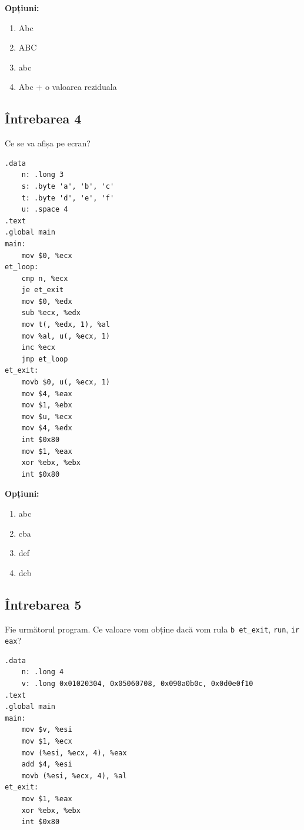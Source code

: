 \documentclass[12pt,a4paper]{article}
\begin{document}
\textbf{Opțiuni:}
\begin{multicols}{2}
\begin{enumerate}[label=\alph*)]
    \item Abc
    \item ABC 
    \item abc
    \item Abc + o valoarea reziduala
\end{enumerate}
\end{multicols}

\subsection*{Întrebarea 4}
Ce se va afișa pe ecran?
\begin{multicols}{2}
\begin{lstlisting}[language=x86asm]
.data
    n: .long 3
    s: .byte 'a', 'b', 'c'
    t: .byte 'd', 'e', 'f'
    u: .space 4
.text
.global main
main:
    mov $0, %ecx
et_loop:
    cmp n, %ecx
    je et_exit
    mov $0, %edx
    sub %ecx, %edx
    mov t(, %edx, 1), %al
    mov %al, u(, %ecx, 1)
    inc %ecx
    jmp et_loop
et_exit:
    movb $0, u(, %ecx, 1)
    mov $4, %eax
    mov $1, %ebx
    mov $u, %ecx
    mov $4, %edx
    int $0x80
    mov $1, %eax
    xor %ebx, %ebx
    int $0x80
\end{lstlisting}
\end{multicols}

\textbf{Opțiuni:}
\begin{multicols}{2}
\begin{enumerate}[label=\alph*)]
    \item abc
    \item cba
    \item def
    \item dcb 
\end{enumerate}
\end{multicols}
\newpage

\subsection*{Întrebarea 5}
Fie următorul program. Ce valoare vom obține dacă vom rula \texttt{b et\_exit}, \texttt{run}, \texttt{ir eax}?
\begin{lstlisting}[language=x86asm]
.data
    n: .long 4
    v: .long 0x01020304, 0x05060708, 0x090a0b0c, 0x0d0e0f10
.text
.global main
main:
    mov $v, %esi
    mov $1, %ecx
    mov (%esi, %ecx, 4), %eax
    add $4, %esi
    movb (%esi, %ecx, 4), %al
et_exit:
    mov $1, %eax
    xor %ebx, %ebx
    int $0x80
\end{lstlisting}
\end{document}
